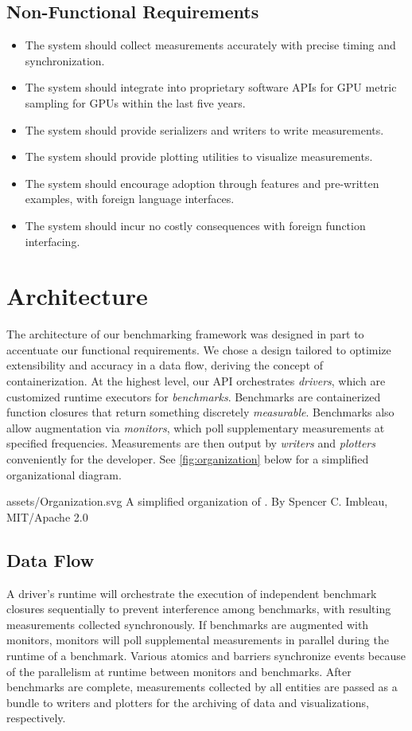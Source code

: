 \subsection{Non-Functional Requirements}
\begin{itemize}
	\item The system should collect measurements accurately with precise timing and synchronization.
	\item The system should integrate into proprietary software APIs for GPU metric sampling for GPUs within the last five years.
	\item The system should provide serializers and writers to write measurements.
	\item The system should provide plotting utilities to visualize measurements.
	\item The system should encourage adoption through features and pre-written examples, with foreign language interfaces.
	\item The system should incur no costly consequences with foreign function interfacing.
\end{itemize}

\section{Architecture}

The architecture of our benchmarking framework was designed in part to accentuate our functional requirements. We chose a design tailored to optimize extensibility and accuracy in a data flow, deriving the concept of containerization. At the highest level, our API orchestrates \emph{drivers}, which are customized runtime executors for \emph{benchmarks}. Benchmarks are containerized function closures that return something discretely \emph{measurable}. Benchmarks also allow augmentation via \emph{monitors}, which poll supplementary measurements at specified frequencies. Measurements are then output by \emph{writers} and \emph{plotters} conveniently for the developer. See \cref{fig:organization} below for a simplified organizational diagram.\medskip

\widesvg
{assets/Organization.svg}
{A simplified organization of \toolname.\label{fig:organization}}
{By Spencer C. Imbleau, MIT/Apache 2.0}
\medskip

\subsection{Data Flow}
A driver's runtime will orchestrate the execution of independent benchmark closures sequentially to prevent interference among benchmarks, with resulting measurements collected synchronously. If benchmarks are augmented with monitors, monitors will poll supplemental measurements in parallel during the runtime of a benchmark. Various atomics and barriers synchronize events because of the parallelism at runtime between monitors and benchmarks. After benchmarks are complete, measurements collected by all entities are passed as a bundle to writers and plotters for the archiving of data and visualizations, respectively.\medskip

